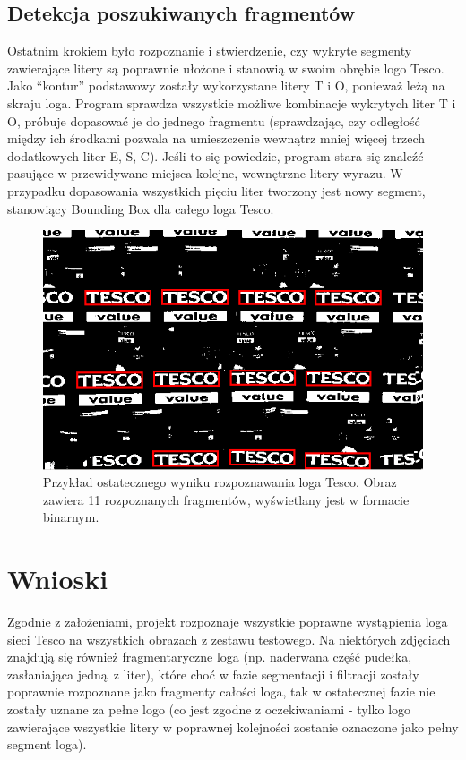 \documentclass[11pt,a4paper]{article} %
\numberwithin{equation}{section} %
\numberwithin{figure}{section} %
\numberwithin{table}{section} %
\begin{document}
\subsection{Detekcja poszukiwanych fragmentów}

Ostatnim krokiem było rozpoznanie i stwierdzenie, czy wykryte segmenty zawierające litery są poprawnie ułożone i stanowią w swoim obrębie logo Tesco. Jako ``kontur'' podstawowy zostały wykorzystane litery T i O, ponieważ leżą na skraju loga. Program sprawdza wszystkie możliwe kombinacje wykrytych liter T i O, próbuje dopasować je do jednego fragmentu (sprawdzając, czy odległość między ich środkami pozwala na umieszczenie wewnątrz mniej więcej trzech dodatkowych liter E, S, C). Jeśli to się powiedzie, program stara się znaleźć pasujące w przewidywane miejsca kolejne, wewnętrzne litery wyrazu. W przypadku dopasowania wszystkich pięciu liter tworzony jest nowy segment, stanowiący Bounding Box dla całego loga Tesco.

\begin{figure}
	\centering
	\includegraphics[width=14cm]{pobr_proj_bin1.png}
	\caption{Przykład ostatecznego wyniku rozpoznawania loga Tesco. Obraz zawiera 11 rozpoznanych fragmentów, wyświetlany jest w formacie binarnym.}
	\label{fig:pobr_proj_bin1}
\end{figure}

\section{Wnioski}

Zgodnie z założeniami, projekt rozpoznaje wszystkie poprawne wystąpienia loga sieci Tesco na wszystkich obrazach z zestawu testowego. Na niektórych zdjęciach znajdują się również fragmentaryczne loga (np. naderwana część pudełka, zasłaniająca jedną z liter), które choć w fazie segmentacji i filtracji zostały poprawnie rozpoznane jako fragmenty całości loga, tak w ostatecznej fazie nie zostały uznane za pełne logo (co jest zgodne z oczekiwaniami - tylko logo zawierające wszystkie litery w poprawnej kolejności zostanie oznaczone jako pełny segment loga).
\end{document}
